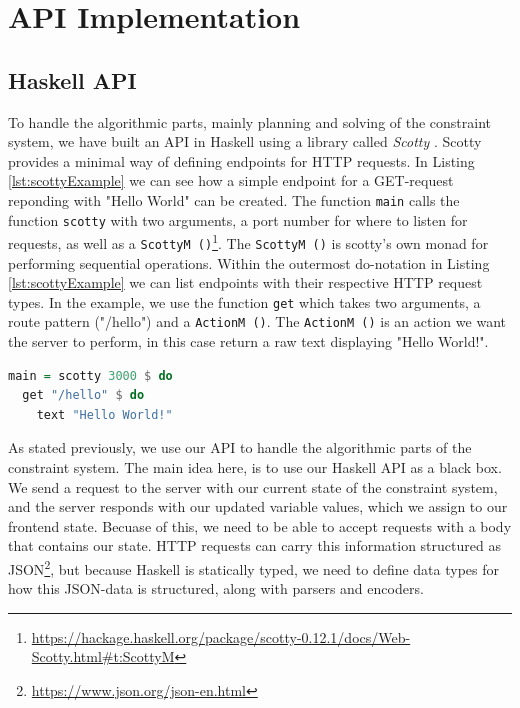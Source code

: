 \documentclass[11pt, a4paper]{article}
\begin{document}
\section{API Implementation}
\label{sec:api}
\subsection{Haskell API}
\label{sec:haskellapi}
To handle the algorithmic parts, mainly planning and solving of the constraint system, we have built an API in Haskell using a library called \textit{Scotty} \cite{scottyArticle, scottyHackage}. Scotty provides a minimal way of defining endpoints for HTTP requests. In Listing \ref{lst:scottyExample} we can see how a simple endpoint for a GET-request reponding with "Hello World" can be created. The function \texttt{main} calls the function \texttt{scotty} with two arguments, a port number for where to listen for requests, as well as a \texttt{ScottyM ()}\footnote{\url{https://hackage.haskell.org/package/scotty-0.12.1/docs/Web-Scotty.html\#t:ScottyM}}. The \texttt{ScottyM ()} is scotty's own monad for performing sequential operations. Within the outermost do-notation in Listing \ref{lst:scottyExample} we can list endpoints with their respective HTTP request types. In the example, we use the function \texttt{get} which takes two arguments, a route pattern ("/hello") and a \texttt{ActionM ()}. The \texttt{ActionM ()} is an action we want the server to perform, in this case return a raw text displaying "Hello World!".

\begin{lstlisting}[language=haskell, caption={Example of a simple endpoint in Scotty.}, label={lst:scottyExample}]
main = scotty 3000 $ do
  get "/hello" $ do
    text "Hello World!"
\end{lstlisting}

As stated previously, we use our API to handle the algorithmic parts of the constraint system. The main idea here, is to use our Haskell API as a black box. We send a request to the server with our current state of the constraint system, and the server responds with our updated variable values, which we assign to our frontend state. Becuase of this, we need to be able to accept requests with a body that contains our state. HTTP requests can carry this information structured as JSON\footnote{\url{https://www.json.org/json-en.html}}, but because Haskell is statically typed, we need to define data types for how this JSON-data is structured, along with parsers and encoders.
\end{document}
